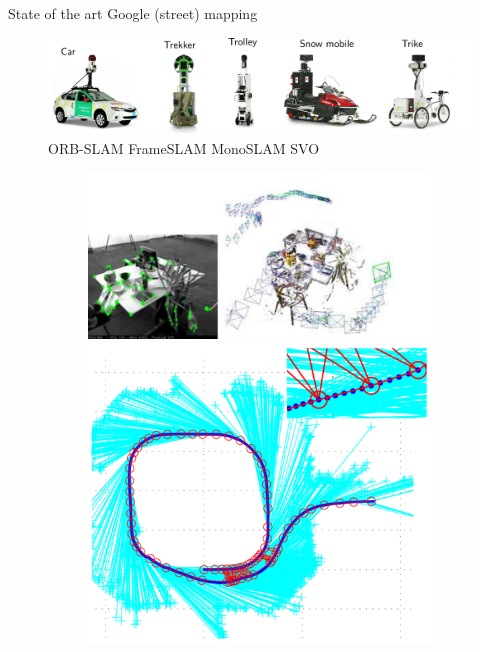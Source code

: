 \documentclass[11pt]{beamer}
\begin{document}
\begin{frame}{State of the art}
Google (street) mapping
\begin{figure}[!htb]
\centering
\includegraphics[width=\textwidth]{figures/introduction/google_fleet.pdf}
\vspace{10pt}\\
ORB-SLAM \hspace{15pt} FrameSLAM \hspace{10pt} MonoSLAM \hspace{20pt} SVO\hfill\vspace{5pt}\\
\begin{subfigure}[b]{\textwidth}
\includegraphics[scale=0.2]{figures/introduction/ORB_SLAM.pdf}
\includegraphics[scale=0.1]{figures/introduction/frameslam.pdf}

\end{subfigure}
\end{figure}
\end{frame}
\end{document}
